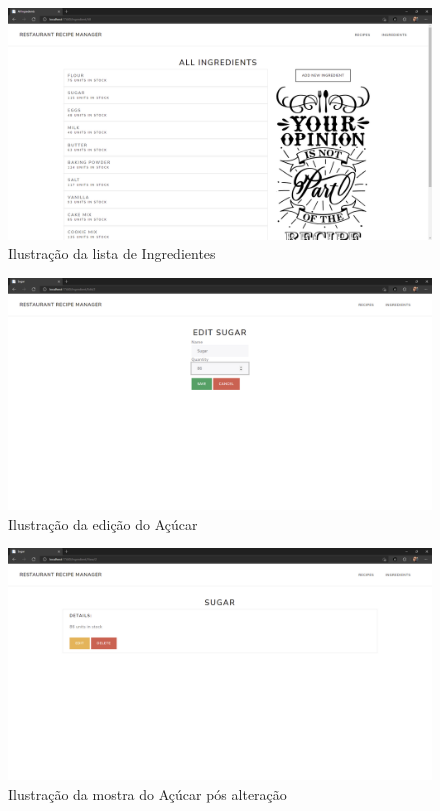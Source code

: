 \begin{figure}[!hbt]
    \centering
    \includegraphics[width=14cm]{Resources/WebApp/Ingredients/ingredient (1).png}
    \caption{Ilustração da lista de Ingredientes}
    
\end{figure}
\FloatBarrier
\begin{figure}[!hbt]
    \centering
    \includegraphics[width=14cm]{Resources/WebApp/Ingredients/ingredient (2).png}
    \caption{Ilustração da edição do Açúcar}
    
\end{figure}
\FloatBarrier
\begin{figure}[!hbt]
    \centering
    \includegraphics[width=14cm]{Resources/WebApp/Ingredients/ingredient (3).png}
    \caption{Ilustração da mostra do Açúcar pós alteração}
    
\end{figure}
